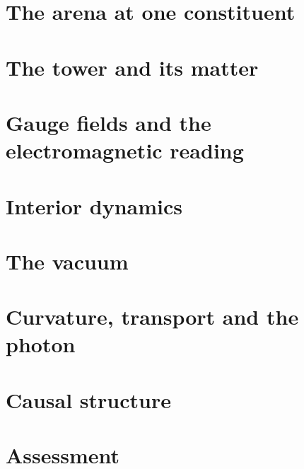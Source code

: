\documentclass[11pt]{article}
\theoremstyle{plain}
\theoremstyle{definition}
\begin{document}
\tableofcontents


\part{The arena at one constituent}




\part{The tower and its matter}





\part{Gauge fields and the electromagnetic reading}






\part{Interior dynamics}





\part{The vacuum}





\part{Curvature, transport and the photon}




\part{Causal structure}




\part{Assessment}

\appendix
{}



\end{document}
